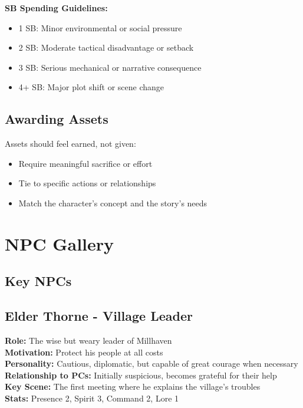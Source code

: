 \documentclass[11pt]{article}
\newenvironment{characterbox}[1]{%
  \begin{mdframed}[backgroundcolor=shadecolor, linewidth=1pt, linecolor=headercolor]%
  \subsection*{#1}%
}{%
  \end{mdframed}%
}
\begin{document}
\textbf{SB Spending Guidelines:}
\begin{itemize}
\item 1 SB: Minor environmental or social pressure
\item 2 SB: Moderate tactical disadvantage or setback
\item 3 SB: Serious mechanical or narrative consequence
\item 4+ SB: Major plot shift or scene change
\end{itemize}

\subsection{Awarding Assets}

Assets should feel earned, not given:
\begin{itemize}
\item Require meaningful sacrifice or effort
\item Tie to specific actions or relationships
\item Match the character's concept and the story's needs
\end{itemize}

\section{NPC Gallery}

\subsection{Key NPCs}

\begin{characterbox}{Elder Thorne - Village Leader}
\textbf{Role:} The wise but weary leader of Millhaven \\
\textbf{Motivation:} Protect his people at all costs \\
\textbf{Personality:} Cautious, diplomatic, but capable of great courage when necessary \\
\textbf{Relationship to PCs:} Initially suspicious, becomes grateful for their help \\
\textbf{Key Scene:} The first meeting where he explains the village's troubles \\
\textbf{Stats:} Presence 2, Spirit 3, Command 2, Lore 1
\end{characterbox}
\end{document}
